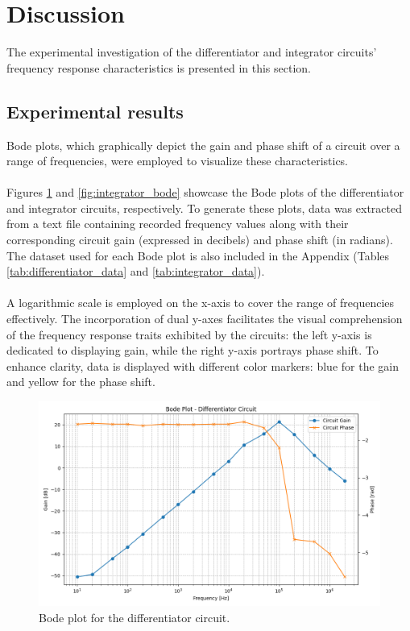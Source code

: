 \section{Discussion}
The experimental investigation of the differentiator and integrator circuits' frequency response characteristics is presented in this section.
	
	\subsection{Experimental results}
		Bode plots, which graphically depict the gain and phase shift of a circuit over a range of frequencies, were employed to visualize these characteristics. \\\\
		Figures \ref{fig:differentiator_bode} and \ref{fig:integrator_bode} showcase the Bode plots of the differentiator and integrator circuits, respectively.
		To generate these plots, data was extracted from a text file containing recorded frequency values along with their corresponding circuit gain (expressed in decibels) and phase shift (in radians). 
		The dataset used for each Bode plot is also included in the Appendix (Tables \ref{tab:differentiator_data} and \ref{tab:integrator_data}). \\\\
		A logarithmic scale is employed on the x-axis to cover the range of frequencies effectively. 
		The incorporation of dual y-axes facilitates the visual comprehension of the frequency response traits exhibited by the circuits: 
		the left y-axis is dedicated to displaying gain, while the right y-axis portrays phase shift.
		To enhance clarity, data is displayed with different color markers: blue for the gain and yellow for the phase shift.

		\begin{figure}[H]
		    \centering
		    \includegraphics[width=1\textwidth]{figures/differentiator/bode_plot.png}
		    \caption{Bode plot for the differentiator circuit.}
		    \label{fig:differentiator_bode} 
		\end{figure}


